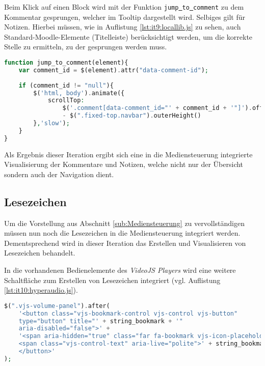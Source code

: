 Beim Klick auf einen Block wird mit der Funktion \texttt{jump\underline{{ }}to\underline{{ }}comment} zu dem Kommentar gesprungen, welcher im Tooltip dargestellt wird. Selbiges gilt für Notizen. Hierbei müssen, wie in Auflistung \ref{lst:it9:locallib.js} zu sehen, auch Standard-Moodle-Elemente (Titelleiste) berücksichtigt werden, um die korrekte Stelle zu ermitteln, zu der gesprungen werden muss.

\begin{lstlisting}[language=php,
             linewidth=\textwidth,
             caption={Ausschnitt der \textbf{locallib.js} in der 9. Iteration},
             label={lst:it9:locallib.js}]
function jump_to_comment(element){
    var comment_id = $(element).attr("data-comment-id");
	
    if (comment_id != "null"){
        $('html, body').animate({
            scrollTop:
                $('.comment[data-comment_id="' + comment_id + '"]').offset().top
                - $(".fixed-top.navbar").outerHeight()
        },'slow');
    }
}
\end{lstlisting}
Als Ergebnis dieser Iteration ergibt sich eine in die Mediensteuerung integrierte Visualisierung der Kommentare und Notizen, welche nicht nur der Übersicht sondern auch der Navigation dient.


\subsection{Lesezeichen}
Um die Vorstellung aus Abschnitt \ref{sub:Mediensteuerung} zu vervollständigen müssen nun noch die Lesezeichen in die Mediensteuerung integriert werden. Dementsprechend wird in dieser Iteration das Erstellen und Visualisieren von Lesezeichen behandelt.

In die vorhandenen Bedienelemente des \textit{VideoJS Players} wird eine weitere Schaltfläche zum Erstellen von Lesezeichen integriert (vgl. Auflistung \ref{lst:it10:hyperaudio.js}).

\begin{lstlisting}[language=php,
             linewidth=\textwidth,
             caption={Ausschnitt der \textbf{hyperaudio.js} in der 10. Iteration},
             label={lst:it10:hyperaudio.js}]
$(".vjs-volume-panel").after(
    '<button class="vjs-bookmark-control vjs-control vjs-button"
    type="button" title="' + string_bookmark + '"
    aria-disabled="false">' +
    '<span aria-hidden="true" class="far fa-bookmark vjs-icon-placeholder"></span>
    <span class="vjs-control-text" aria-live="polite">' + string_bookmark + '</span>
    </button>'
);
\end{lstlisting}

